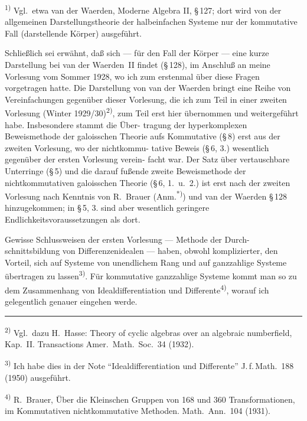 \documentclass[12pt,a4paper]{article}
\theoremstyle{plain}
\begin{document}
{\small
\textsuperscript{1)} Vgl.\ etwa van der Waerden, Moderne Algebra II, \S\,127; dort wird von der allgemeinen
Darstellungstheorie der halbeinfachen Systeme nur der kommutative Fall (darstellende K\"orper)
ausgef\"uhrt.
}

\medskip


\smallskip
\noindent
Schlie\ss lich sei erw\"ahnt, da\ss{} sich --- f\"ur den Fall der K\"orper --- eine
kurze Darstellung bei van der Waerden~II findet (\S\,128), im Anschlu\ss{} an
meine Vorlesung vom Sommer 1928, wo ich zum erstenmal \"uber diese
Fragen vorgetragen hatte. Die Darstellung von van der Waerden bringt
eine Reihe von Vereinfachungen gegen\"uber dieser Vorlesung, die ich zum
Teil in einer zweiten Vorlesung (Winter 1929/30)\textsuperscript{2)}, zum Teil erst hier
\"ubernommen und weitergef\"uhrt habe. Insbesondere stammt die \"Uber-
tragung der hyperkomplexen Beweismethode der galoisschen Theorie aufs
Kommutative (\S\,8) erst aus der zweiten Vorlesung, wo der nichtkommu-
tative Beweis (\S\,6, 3.) wesentlich gegen\"uber der ersten Vorlesung verein-
facht war. Der Satz \"uber vertauschbare Unterringe (\S\,5) und die darauf
fu\ss ende zweite Beweismethode der nichtkommutativen galoisschen Theorie
(\S\,6, 1.\ u.\ 2.) ist erst nach der zweiten Vorlesung nach Kenntnis von
R.~Brauer (Anm.\textsuperscript{*)}) und van der Waerden \S\,128 hinzugekommen; in \S\,5, 3.
sind aber wesentlich geringere Endlichkeitsvoraussetzungen als dort.

Gewisse Schlussweisen der ersten Vorlesung --- Methode der Durch-
schnittsbildung von Differenzenidealen --- haben, obwohl komplizierter, den
Vorteil, sich auf Systeme von unendlichem Rang und auf ganzzahlige
Systeme \"ubertragen zu lassen\textsuperscript{3)}. F\"ur kommutative ganzzahlige Systeme
kommt man so zu dem Zusammenhang von Idealdifferentiation und
Differente\textsuperscript{4)}, worauf ich gelegentlich genauer eingehen werde.

\smallskip
\noindent\rule{0.3\textwidth}{0.4pt}

{\small
\textsuperscript{2)} Vgl.\ dazu H.~Hasse: Theory of cyclic algebras over an algebraic numberfield, Kap.~II.
Transactions Amer.\ Math.\ Soc.\ 34 (1932).

\textsuperscript{3)} Ich habe dies in der Note ``Idealdifferentiation und Differente'' J.\,f.\,Math.\ 188
(1950) ausgef\"uhrt.

\textsuperscript{4)} R.~Brauer, \"Uber die Kleinschen Gruppen von 168 und 360 Transformationen,
im Kommutativen nichtkommutative Methoden. Math.\ Ann.\ 104 (1931).
}
\end{document}
